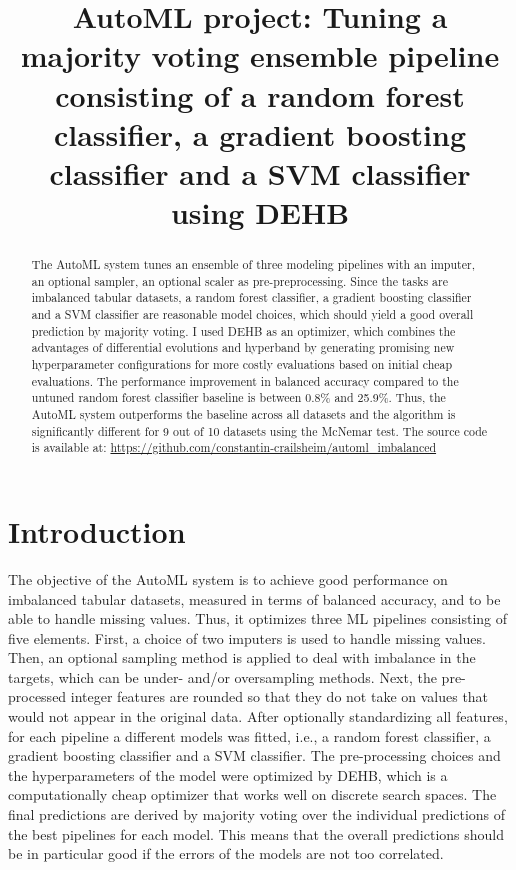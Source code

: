 \documentclass[11pt]{article}
\title{AutoML project: Tuning a majority voting ensemble pipeline consisting of a random forest classifier, a gradient boosting classifier and a SVM classifier using DEHB}
\author[1]{\nameemail{Constantin von Crailsheim}{C.Crailsheim@campus.lmu.de}}
\affil[1]{LMU Munich, Institute of Statistics}
\begin{document}
\maketitle

\begin{abstract}
The AutoML system tunes an ensemble of three modeling pipelines with an imputer, an optional sampler, an optional scaler as pre-preprocessing. Since the tasks are imbalanced tabular datasets, a random forest classifier, a gradient boosting classifier and a SVM classifier are reasonable model choices, which should yield a good overall prediction by majority voting. I used DEHB as an optimizer, which combines the advantages of differential evolutions and hyperband by generating promising new hyperparameter configurations for more costly evaluations based on initial cheap evaluations. The performance improvement in balanced accuracy compared to the untuned random forest classifier baseline is between 0.8\% and 25.9\%. Thus, the AutoML system outperforms the baseline across all datasets and the algorithm is significantly different for 9 out of 10 datasets using the McNemar test. The source code is available at: \url{https://github.com/constantin-crailsheim/automl_imbalanced}
\end{abstract}



\section{Introduction}

The objective of the AutoML system is to achieve good performance on imbalanced tabular datasets, measured in terms of balanced accuracy, and to be able to handle missing values. Thus, it optimizes three ML pipelines consisting of five elements. First, a choice of two imputers is used to handle missing values. Then, an optional sampling method is applied to deal with imbalance in the targets, which can be under- and/or oversampling methods. Next, the pre-processed integer features are rounded so that they do not take on values that would not appear in the original data. After optionally standardizing all features, for each pipeline a different models was fitted, i.e., a random forest classifier, a gradient boosting classifier and a SVM classifier. The pre-processing choices and the hyperparameters of the model were optimized by DEHB, which is a computationally cheap optimizer that works well on discrete search spaces. The final predictions are derived by majority voting over the individual predictions of the best pipelines for each model. This means that the overall predictions should be in particular good if the errors of the models are not too correlated.
\end{document}
